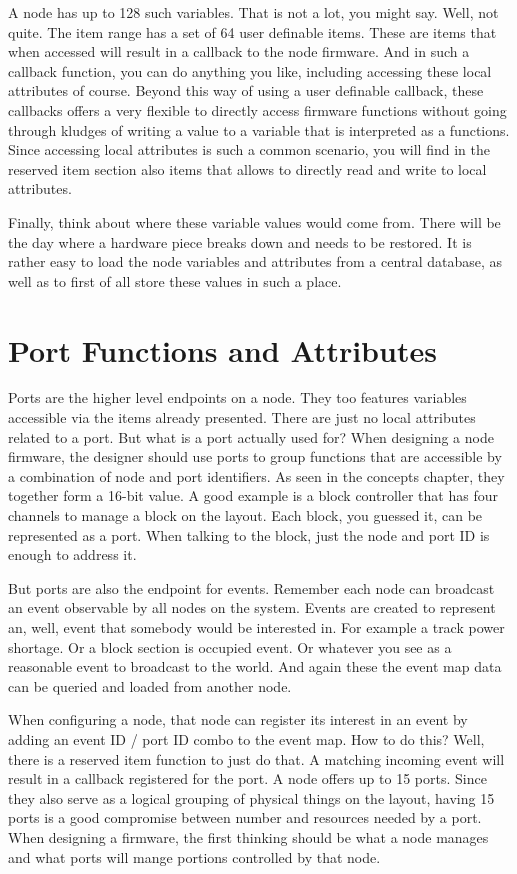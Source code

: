 A node has up to 128 such variables. That is not a lot, you might say. Well, not quite. The item range has a set of 64 user definable items. These are items that when accessed will result in a callback to the node firmware. And in such a callback function, you can do anything you like, including accessing these local attributes of course. Beyond this way of using a user definable callback, these callbacks offers a very flexible to directly access firmware functions without going through kludges of writing a value to a variable that is interpreted as a functions. Since accessing local attributes is such a common scenario, you will find in the reserved item section also items that allows to directly read and write to local attributes.

Finally, think about where these variable values would come from. There will be the day where a hardware piece breaks down and needs to be restored. It is rather easy to load the node variables and attributes from a central database, as well as to first of all store these values in such a place.

\section{Port Functions and Attributes}

Ports are the higher level endpoints on a node. They too features variables accessible via the items already presented. There are just no local attributes related to a port. But what is a port actually used for? When designing a node firmware, the designer should use ports to group functions that are accessible by a combination of node and port identifiers. As seen in the concepts chapter, they together form a 16-bit value. A good example is a block controller that has four channels to manage a block on the layout. Each block, you guessed it, can be represented as a port. When talking to the block, just the node and port ID is enough to address it.

But ports are also the endpoint for events. Remember each node can broadcast an event observable by all nodes on the system. Events are created to represent an, well, event that somebody would be interested in. For example a track power shortage. Or a block section is occupied event. Or whatever you see as a reasonable event to broadcast to the world. And again these the event map data can be queried and loaded from another node.

When configuring a node, that node can register its interest in an event by adding an event ID / port ID combo to the event map. How to do this? Well, there is a reserved item function to just do that. A matching incoming event will result in a callback registered for the port. A node offers up to 15 ports. Since they also serve as a logical grouping of physical things on the layout, having 15 ports is a good compromise between number and resources needed by a port. When designing a firmware, the first thinking should be what a node manages and what ports will mange portions controlled by that node.

